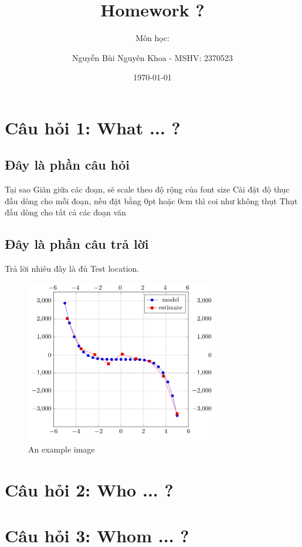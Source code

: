 \documentclass[11pt,a4paper]{scrartcl} %
\begin{document}
\title{Homework ?}
\subtitle{Môn học: }
\author{Nguyễn Bùi Nguyên Khoa - MSHV: 2370523}
\date{\today}
\maketitle

\section{Câu hỏi 1: What ... ?}
\subsection{Đây là phần câu hỏi}
Tại sao Giãn giữa các đoạn, sẽ scale theo độ rộng của font size Cài đặt độ thục đầu dòng cho mỗi đoạn, nếu đặt bằng 0pt hoặc 0cm thì coi như không thụt Thụt đầu dòng cho tất cả các đoạn văn

\subsection{Đây là phần câu trả lời}
Trả lời nhiêu đây là đủ
\lipsum[1-4] %
Test location.
\begin{figure}[ht]
    \centering
    \includegraphics[width=0.75\textwidth]{sample_image.png}
    \caption{An example image}
\end{figure}
\lipsum[6-10] %

\section{Câu hỏi 2: Who ... ?}

\section{Câu hỏi 3: Whom ... ?}
\end{document}
